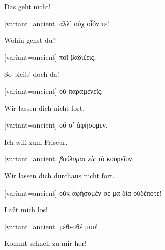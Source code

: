Das geht nicht!

\switchcolumn

\begin{greek}[variant=ancient]%
ἀλλ' οὐχ οἷόν τε!

\end{greek}%
\switchcolumn*

Wohin gehst du?

\switchcolumn

\begin{greek}[variant=ancient]%
ποῖ βαδίζεις;

\end{greek}%
\switchcolumn*

So bleib' doch da!

\switchcolumn

\begin{greek}[variant=ancient]%
οὐ παραμενεῖς;

\end{greek}%
\switchcolumn*

Wir lassen dich nicht fort.

\switchcolumn

\begin{greek}[variant=ancient]%
οὔ σ' ἀφήσομεν.

\end{greek}%
\switchcolumn*

Ich will zum Friseur.

\switchcolumn

\begin{greek}[variant=ancient]%
\emph{βούλομαι εἰς} τὸ κουρεῖον.

\end{greek}%
\switchcolumn*

Wir lassen dich durchaus nicht fort.

\switchcolumn

\begin{greek}[variant=ancient]%
οὐκ ἀφήσομέν σε μά δία οὐδέποτε!

\end{greek}%
\switchcolumn*

Laßt mich los!

\switchcolumn

\begin{greek}[variant=ancient]%
μέθεσθέ μου!

\end{greek}%
\switchcolumn*

Kommt schnell zu mir her!

\switchcolumn


